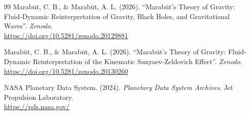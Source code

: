 \documentclass[11pt, a4paper]{article}
\begin{document}
\begin{thebibliography}{99}
  Marab\={u}t, C. B., \& Marab\={u}t, A. L. (2026). ``Marab\={u}t's Theory of Gravity: Fluid-Dynamic Reinterpretation of Gravity, Black Holes, and Gravitational Waves''. \textit{Zenodo}. \\ \url{https://doi.org/10.5281/zenodo.20129881}

  Marab\={u}t, C. B., \& Marab\={u}t, A. L. (2026). ``Marab\={u}t's Theory of Gravity: Fluid-Dynamic Reinterpretation of the Kinematic Sunyaev-Zeldovich Effect''. \textit{Zenodo}. \\ \url{https://doi.org/10.5281/zenodo.20130260}

  NASA Planetary Data System. (2024). \textit{Planetary Data System Archives}. Jet Propulsion Laboratory. \\ \url{https://pds.nasa.gov/}

\end{thebibliography}
\end{document}
